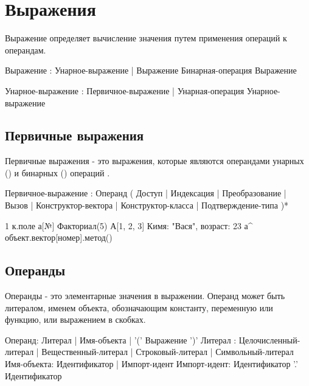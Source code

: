 \hypertarget{expressions}{%
\section{Выражения}\label{expr:chapter}}

Выражение определяет вычисление значения путем применения операций к операндам. 

\begin{Grammar}
Выражение
    : Унарное-выражение
    | Выражение Бинарная-операция Выражение

Унарное-выражение
    : Первичное-выражение
    | Унарная-операция Унарное-выражение
\end{Grammar}    

\hypertarget{primary-expr}{%
\subsection{Первичные выражения}\label{expr:primary-expr}}

Первичные выражения - это выражения, которые являются операндами унарных () и бинарных () операций .

\begin{Grammar}
Первичное-выражение
    : Операнд
    ( Доступ
    | Индексация
    | Преобразование
    | Вызов
    | Конструктор-вектора
    | Конструктор-класса
    | Подтверждение-типа
    )*
\end{Grammar}    

\begin{Trivil}
1
к.поле
а[№]
Факториал(5)
А[1, 2, 3]
К{имя: "Вася", возраст: 23}
а^
объект.вектор[номер].метод()
\end{Trivil}

\hypertarget{operands}{%
\subsection{Операнды}\label{expr:operands}}

Операнды - это элементарные значения в выражении. Операнд может быть литералом, именем объекта, 
обозначающим константу, переменную или функцию, или выражением в скобках.

\begin{Grammar}
Операнд: Литерал | Имя-объекта | '(' Выражение ')'
Литерал
    : Целочисленный-литерал
    | Вещественный-литерал
    | Строковый-литерал
    | Символьный-литерал
Имя-объекта: Идентификатор | Импорт-идент
Импорт-идент: Идентификатор '.' Идентификатор
\end{Grammar}    

